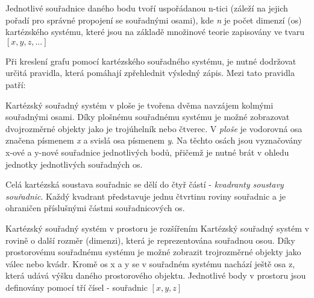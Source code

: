 Jednotlivé souřadnice daného bodu tvoří uspořádanou n-tici (záleží na jejich pořadí pro správné propojení se souřadnými osami), kde {\it n} je počet dimenzí (os) kartézského systému, které jsou na základě množinové teorie zapisovány ve tvaru $[x,y,z, ...]$

Při kreslení grafu pomocí kartézského souřadného systému, je nutné dodržovat určitá pravidla, která pomáhají zpřehlednit výsledný zápis. Mezi tato pravidla patří:



Kartézský souřadný systém v ploše je tvořena dvěma navzájem kolmými souřadnými osami. Díky plošnému souřadnému systému je možné zobrazovat dvojrozměrné objekty jako je trojúhelník nebo čtverec. V {\it ploše} je vodorovná osa značena písmenem {\it x} a svislá osa písmenem {\it y}. Na těchto osách jsou vyznačovány x-ové a y-nové souřadnice jednotlivých bodů, přičemž je nutné brát v ohledu jednotky jednotlivých souřadných os.

Celá kartézská soustava souřadnic se dělí do čtyř částí - {\it kvadranty soustavy souřadnic}. Každý kvadrant představuje jednu čtvrtinu roviny souřadnic a je ohraničen příslušnými částmi souřadnicových os.

\vskip 4mm
\centerline{}
\vskip 4mm


Kartézský souřadný systém v prostoru je rozšířením Kartézský souřadný systém v rovině o další rozměr (dimenzi), která je reprezentována souřadnou osou. Díky prostorovému souřadnému systému je možné zobrazit trojrozměrné objekty jako válec nebo kvádr. Kromě os x a y se v souřadném systému nachází ještě osa z, která udává výšku daného prostorového objektu. Jednotlivé body v prostoru jsou definovány pomocí tří čísel - souřadnic $[x,y,z]$

\vskip 4mm
\centerline{}
\vskip 4mm


